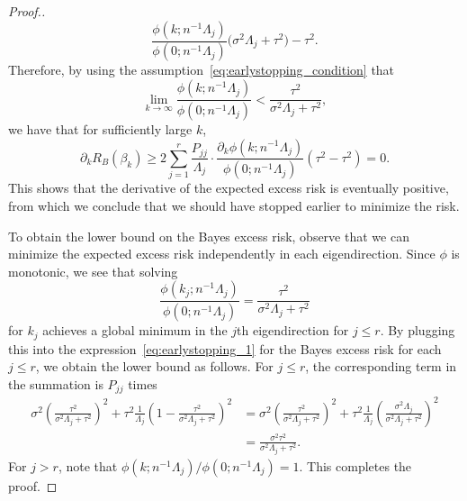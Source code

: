 \documentclass[10pt,a4paper]{amsart}
\begin{document}
\begin{proof}[Proof.]
\[
    \frac{\phi(k;n^{-1}\Lambda_j)}{\phi(0; n^{-1}\Lambda_j)} \Big(\sigma^2 \Lambda_j + \tau^2\Big) - \tau^2.
\]
Therefore, by using the assumption~\eqref{eq:earlystopping_condition} that 
\[
    \lim_{k \to \infty} \frac{\phi(k;n^{-1}\Lambda_j)}{\phi(0; n^{-1}\Lambda_j)} < \frac{\tau^2}{\sigma^2\Lambda_j + \tau^2},
\]
we have that for sufficiently large $k$,
\[
    \partial_k R_B(\beta_k) \ge 2 \sum_{j=1}^{r} \frac{P_{jj}}{\Lambda_j} \cdot \frac{\partial_k \phi(k; n^{-1} \Lambda_j)}{\phi(0; n^{-1} \Lambda_j)} (\tau^2 - \tau^2) = 0.
\]
This shows that the derivative of the expected excess risk is eventually positive, from which we conclude that we should have stopped earlier to minimize the risk.

To obtain the lower bound on the Bayes excess risk, observe that we can minimize the expected excess risk independently in each eigendirection. Since $\phi$ is monotonic, we see that solving 
\[
   \frac{\phi(k_j;n^{-1}\Lambda_j)}{\phi(0; n^{-1}\Lambda_j)} = \frac{\tau^2}{\sigma^2\Lambda_j + \tau^2}
\]
for $k_j$ achieves a global minimum in the $j$th eigendirection for $j \le r$. By plugging this into the expression~\eqref{eq:earlystopping_1} for the Bayes excess risk for each $j \le r$, we obtain the lower bound as follows. For $j \le r$, the corresponding term in the summation is $P_{jj}$ times 
\begin{align*}
    \sigma^2 \left(\frac{\tau^2}{\sigma^2\Lambda_j + \tau^2}\right)^2 + \tau^2\frac{1}{\Lambda_j}\left(1-\frac{\tau^2}{\sigma^2\Lambda_j + \tau^2}\right)^2
    &= \sigma^2 \left(\frac{\tau^2}{\sigma^2\Lambda_j + \tau^2}\right)^2 + \tau^2\frac{1}{\Lambda_j}\left(\frac{\sigma^2\Lambda_j}{\sigma^2\Lambda_j + \tau^2}\right)^2 \\
    &= \frac{\sigma^2 \tau^2}{\sigma^2\Lambda_j + \tau^2}.
\end{align*}
For $j > r$, note that $\phi(k;n^{-1}\Lambda_j) / \phi(0; n^{-1}\Lambda_j) = 1$. This completes the proof.
\end{proof}
\end{document}
